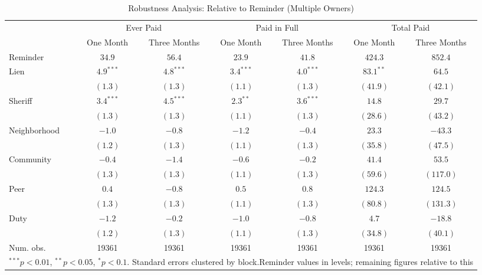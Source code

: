 \begin{table}[htbp]
\caption{Robustness Analysis: Relative to Reminder (Multiple Owners)}
\begin{center}
\begin{tabular}{l c c c c c c }
\hline
 & \multicolumn{2}{c}{Ever Paid} & \multicolumn{2}{c}{Paid in Full} & \multicolumn{2}{c}{Total Paid} \\
 & One Month & Three Months & One Month & Three Months & One Month & Three Months \\
Reminder     & $34.9$ & $56.4$ & $23.9$ & $41.8$ & $424.3$ & $852.4$ \\
\hline
Lien         & $4.9^{***}$  & $4.8^{***}$  & $3.4^{***}$  & $4.0^{***}$  & $83.1^{**}$   & $64.5$        \\
             & $(1.3)$      & $(1.3)$      & $(1.1)$      & $(1.3)$      & $(41.9)$      & $(42.1)$      \\
Sheriff      & $3.4^{***}$  & $4.5^{***}$  & $2.3^{**}$   & $3.6^{***}$  & $14.8$        & $29.7$        \\
             & $(1.3)$      & $(1.3)$      & $(1.1)$      & $(1.3)$      & $(28.6)$      & $(43.2)$      \\
Neighborhood & $-1.0$       & $-0.8$       & $-1.2$       & $-0.4$       & $23.3$        & $-43.3$       \\
             & $(1.2)$      & $(1.3)$      & $(1.1)$      & $(1.3)$      & $(35.8)$      & $(47.5)$      \\
Community    & $-0.4$       & $-1.4$       & $-0.6$       & $-0.2$       & $41.4$        & $53.5$        \\
             & $(1.3)$      & $(1.3)$      & $(1.1)$      & $(1.3)$      & $(59.6)$      & $(117.0)$     \\
Peer         & $0.4$        & $-0.8$       & $0.5$        & $0.8$        & $124.3$       & $124.5$       \\
             & $(1.3)$      & $(1.3)$      & $(1.1)$      & $(1.3)$      & $(80.8)$      & $(131.3)$     \\
Duty         & $-1.2$       & $-0.2$       & $-1.0$       & $-0.8$       & $4.7$         & $-18.8$       \\
             & $(1.2)$      & $(1.3)$      & $(1.1)$      & $(1.3)$      & $(34.8)$      & $(40.1)$      \\
\hline
Num. obs.    & 19361        & 19361        & 19361        & 19361        & 19361         & 19361         \\
\hline
\multicolumn{7}{l}{\scriptsize{$^{***}p<0.01$, $^{**}p<0.05$, $^*p<0.1$. Standard errors clustered by block.Reminder values in levels; remaining figures relative to this}}
\end{tabular}
\label{sh_lpm_mult}
\end{center}
\end{table}
